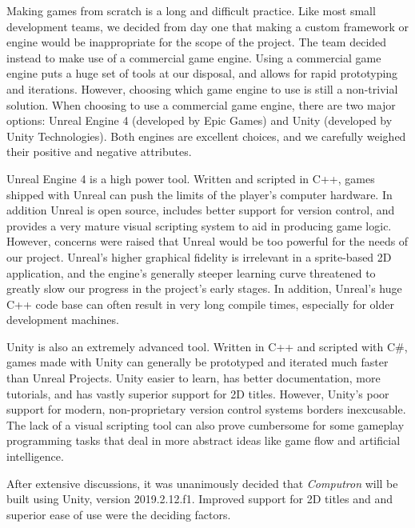 Making games from scratch is a long and difficult practice. Like most small development teams, we decided from day one that making a custom framework or engine would be inappropriate for the scope of the project. The team decided instead to make use of a commercial game engine. Using a commercial game engine puts a huge set of tools at our disposal, and allows for rapid prototyping and iterations. However, choosing which game engine to use is still a non-trivial solution. When choosing to use a commercial game engine, there are two major options: Unreal Engine 4 (developed by Epic Games) and Unity (developed by Unity Technologies). Both engines are excellent choices, and we carefully weighed their positive and negative attributes. 

Unreal Engine 4 is a high power tool. Written and scripted in C++, games shipped with Unreal can push the limits of the player's computer hardware. In addition Unreal is open source, includes better support for version control, and provides a very mature visual scripting system to aid in producing game logic. However, concerns were raised that Unreal would be too powerful for the needs of our project. Unreal's higher graphical fidelity is irrelevant in a sprite-based 2D application, and the engine's generally steeper learning curve threatened to greatly slow our progress in the project's early stages. In addition, Unreal's huge C++ code base can often result in very long compile times, especially for older development machines.

Unity is also an extremely advanced tool. Written in C++ and scripted with C\#, games made with Unity can generally be prototyped and iterated much faster than Unreal Projects. Unity easier to learn, has better documentation, more tutorials, and has vastly superior support for 2D titles. However, Unity's poor support for modern, non-proprietary version control systems borders inexcusable. The lack of a visual scripting tool can also prove cumbersome for some gameplay programming tasks that deal in more abstract ideas like game flow and artificial intelligence.

After extensive discussions, it was unanimously decided that \textit{Computron} will be built using Unity, version 2019.2.12.f1. Improved support for 2D titles and and superior ease of use were the deciding factors.



